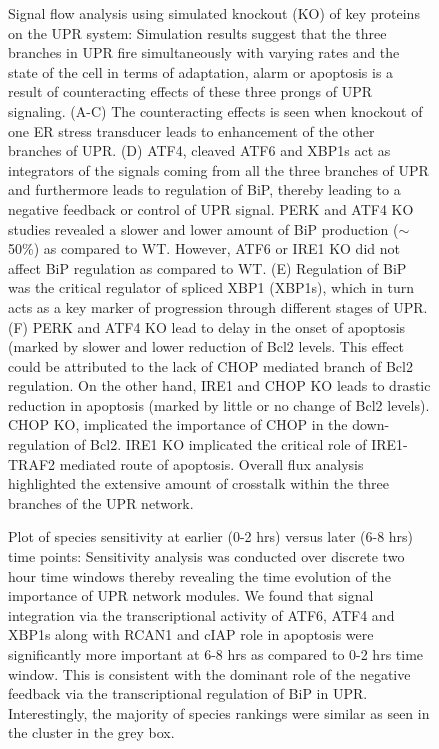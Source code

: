 \begin{figure}\centering
	\caption{Signal flow analysis using simulated knockout (KO) of key proteins on the UPR system: Simulation results suggest that the three branches in UPR fire simultaneously with varying rates and the state of the cell in terms of adaptation, alarm or apoptosis is a result of counteracting effects of these three prongs of UPR signaling. 
	(A-C) The counteracting effects is seen when knockout of one ER stress transducer leads to enhancement of the other branches of UPR. 
	(D) ATF4, cleaved ATF6 and XBP1s act as integrators of the signals coming from all the three branches of UPR and furthermore leads to regulation of BiP, thereby leading to a negative feedback or control of UPR signal. PERK and ATF4 KO studies revealed a slower and lower amount of BiP production ($\sim$ 50\%) as compared to WT. However, ATF6 or IRE1 KO did not affect BiP regulation as compared to WT. 
	(E) Regulation of BiP was the critical regulator of spliced XBP1 (XBP1s), which in turn acts as a key marker of progression through different stages of UPR. 
	(F) PERK and ATF4 KO lead to delay in the onset of apoptosis (marked by slower and lower reduction of Bcl2 levels. This effect could be attributed to the lack of CHOP mediated branch of Bcl2 regulation. On the other hand, IRE1 and CHOP KO leads to drastic reduction in apoptosis (marked by little or no change of Bcl2 levels). CHOP KO, implicated the importance of CHOP in the down-regulation of Bcl2. IRE1 KO implicated the critical role of IRE1-TRAF2 mediated route of apoptosis. 
Overall flux analysis highlighted the extensive amount of crosstalk within the three branches of the UPR network.}
\label{fg:Flux_Supp_Fig1}
\end{figure}

\begin{figure}\centering
	\caption{Plot of species sensitivity at earlier (0-2 hrs) versus later (6-8 hrs) time points: Sensitivity analysis was conducted over discrete two hour time windows thereby revealing the time evolution of the importance of UPR network modules. We found that signal integration via the transcriptional activity of ATF6, ATF4 and XBP1s along with RCAN1 and cIAP role in apoptosis were significantly more important at 6-8 hrs as compared to 0-2 hrs time window. This is consistent with the dominant role of the negative feedback via the transcriptional regulation of BiP in UPR. Interestingly, the majority of species rankings were similar as seen in the cluster in the grey box.}
	\label{fg:Sens_S1}
\end{figure}


